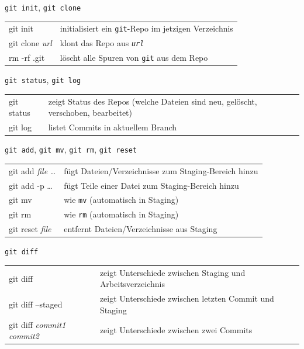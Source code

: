 \begin{frame}{\texttt{git init}, \texttt{git clone}}
  \begin{tabu}{>{\ttfamily}l X[,L]}
    git init               & initialisiert ein \texttt{git}-Repo im jetzigen Verzeichnis \\
    git clone \textit{url} & klont das Repo aus \texttt{\textit{url}} \\
    rm -rf .git            & löscht alle Spuren von \texttt{git} aus dem Repo
  \end{tabu}
\end{frame}

\begin{frame}{\texttt{git status}, \texttt{git log}}
  \begin{tabu}{>{\ttfamily}l X[,L]}
    git status & zeigt Status des Repos (welche Dateien sind neu, gelöscht, verschoben, bearbeitet) \\
    git log    & listet Commits in aktuellem Branch
  \end{tabu}
\end{frame}

\begin{frame}{\texttt{git add}, \texttt{git mv}, \texttt{git rm}, \texttt{git reset}}
  \begin{tabu}{>{\ttfamily}l X[,L]}
    git add \textit{file} … & fügt Dateien/Verzeichnisse zum Staging-Bereich hinzu \\
    git add -p …            & fügt Teile einer Datei zum Staging-Bereich hinzu \\
    git mv                  & wie \texttt{mv} (automatisch in Staging)\\
    git rm                  & wie \texttt{rm} (automatisch in Staging) \\
    git reset \textit{file} & entfernt Dateien/Verzeichnisse aus Staging
  \end{tabu}
\end{frame}

\begin{frame}{\texttt{git diff}}
  \begin{tabu}{>{\ttfamily}l X[,L]}
    git diff                                   & zeigt Unterschiede zwischen Staging und Arbeitsverzeichnis \\
    git diff --staged                          & zeigt Unterschiede zwischen letzten Commit und Staging \\
    git diff \textit{commit1} \textit{commit2} & zeigt Unterschiede zwischen zwei Commits
  \end{tabu}
\end{frame}

